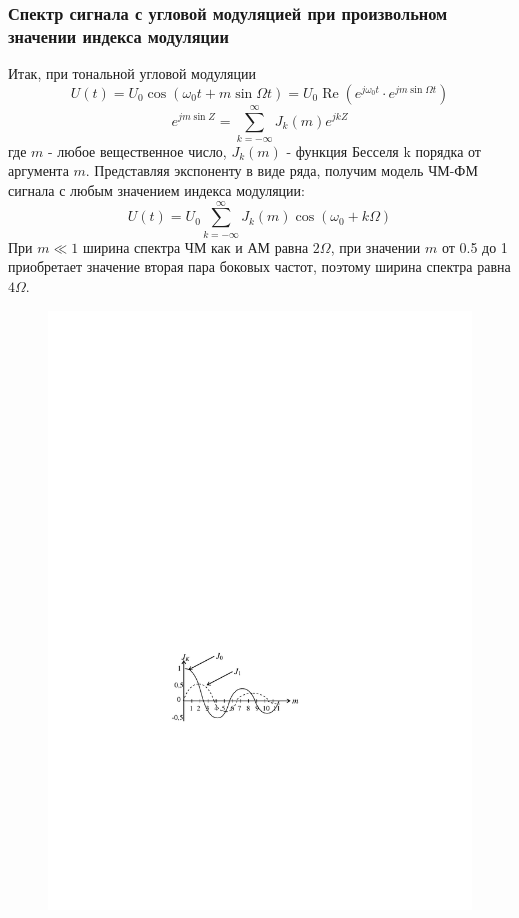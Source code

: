 \subsubsection{Спектр сигнала с угловой модуляцией при произвольном значении индекса модуляции}
Итак, при тональной угловой модуляции
\begin{equation}
	U(t)=U_{0} \cos \left(\omega_{0} t+m \sin \Omega t\right)=U_{0} \operatorname{Re}\left(e^{j \omega_{0} t} \cdot e^{j m \sin \Omega t}\right)
\end{equation}
\begin{equation}
	e^{j m \sin Z}=\sum_{k=-\infty}^{\infty} J_{k}(m) e^{j k Z}
\end{equation}
где $m$ - любое вещественное число, $J_{k}(m)$ - функция Бесселя k порядка от аргумента $m$. 
Представляя экспоненту в виде ряда, получим модель ЧМ-ФМ сигнала  с любым значением индекса модуляции:
\begin{equation}
	U(t)=U_{0} \sum_{k=-\infty}^{\infty} J_{k}(m) \cos \left(\omega_{0}+k \Omega\right)
\end{equation}
При $m\ll 1$ ширина спектра ЧМ как и АМ равна $2\Omega$, при значении $m$ от 0.5 до 1 приобретает значение вторая пара боковых частот, поэтому ширина спектра равна $4\Omega$.
\begin{figure}[H]
	\centering
	\includegraphics[]{fig/fig2-5}
	\caption{}
	\label{fig:2.5}
\end{figure}


